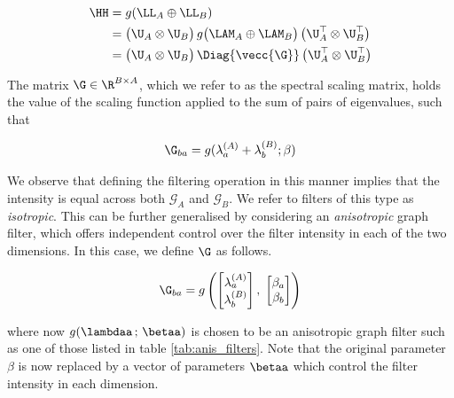 \begin{align} 
    \label{eq:graph_filter}
    \HH &= g(\LL_A \oplus \LL_B) \notag \\ 
       &= \big( \U_A \otimes \U_B \big) \, g \big( \LAM_A \oplus \LAM_B \big) \, \big( \U_A^\top \otimes \U_B^\top \big) \notag \\
       &= \big( \U_A \otimes \U_B \big) \, \Diag{\vecc{\G}} \, \big( \U_A^\top \otimes \U_B^\top \big)
\end{align}


The matrix $\G \in \R^{B \times A}$, which we refer to as the spectral scaling matrix, holds the value of the scaling function applied to the sum of
pairs of eigenvalues, such that

\begin{equation}
    \G_{ba} = g(\lambda^{(A)}_a + \lambda^{(B)}_b; \beta)
\end{equation}

 

We observe that defining the filtering operation in this manner implies that the intensity is equal across both $\mathcal{G}_A$ and $\mathcal{G}_B$. We refer to filters of this type as \textit{isotropic}. This can be further generalised by considering an \textit{anisotropic} graph filter, which offers independent control over the filter intensity in each of the two dimensions. In this case, we define $\G$ as follows. 

\begin{equation}
    \G_{ba} =  g \left( \begin{bmatrix}
        \lambda^{(A)}_a \\ \lambda^{(B)}_b 
    \end{bmatrix}, \; \begin{bmatrix}
        \beta_a \\ \beta_b 
    \end{bmatrix} \right)
\end{equation}

where now $g(\lambdaa \,; \, \betaa)$ is chosen to be an anisotropic graph filter such as one of those listed in table \ref{tab:anis_filters}. Note that the original parameter $\beta$ is now replaced by a vector of parameters $\betaa$ which control the filter intensity in each dimension. 


